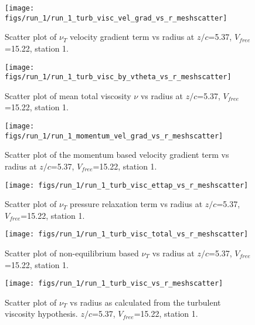 \begin{figure}[H]
\centering
\texttt{[image: figs/run\_1/run\_1\_turb\_visc\_vel\_grad\_vs\_r\_meshscatter]}
\caption{Scatter plot of $\nu_T$ velocity gradient term vs radius at $z/c$=5.37, $V_{free}$=15.22, station 1.}
\end{figure}


\begin{figure}[H]
\centering
\texttt{[image: figs/run\_1/run\_1\_turb\_visc\_by\_vtheta\_vs\_r\_meshscatter]}
\caption{Scatter plot of mean total viscosity $\nu$ vs radius at $z/c$=5.37, $V_{free}$=15.22, station 1.}
\end{figure}


\begin{figure}[H]
\centering
\texttt{[image: figs/run\_1/run\_1\_momentum\_vel\_grad\_vs\_r\_meshscatter]}
\caption{Scatter plot of the momentum based velocity gradient term vs radius at $z/c$=5.37, $V_{free}$=15.22, station 1.}
\end{figure}


\begin{figure}[H]
\centering
\texttt{[image: figs/run\_1/run\_1\_turb\_visc\_ettap\_vs\_r\_meshscatter]}
\caption{Scatter plot of $\nu_T$ pressure relaxation term vs radius at $z/c$=5.37, $V_{free}$=15.22, station 1.}
\end{figure}


\begin{figure}[H]
\centering
\texttt{[image: figs/run\_1/run\_1\_turb\_visc\_total\_vs\_r\_meshscatter]}
\caption{Scatter plot of non-equilibrium based $\nu_T$ vs radius at $z/c$=5.37, $V_{free}$=15.22, station 1.}
\end{figure}


\begin{figure}[H]
\centering
\texttt{[image: figs/run\_1/run\_1\_turb\_visc\_vs\_r\_meshscatter]}
\caption{Scatter plot of $\nu_T$ vs radius as calculated from the turbulent viscosity hypothesis. $z/c$=5.37, $V_{free}$=15.22, station 1.}
\end{figure}


